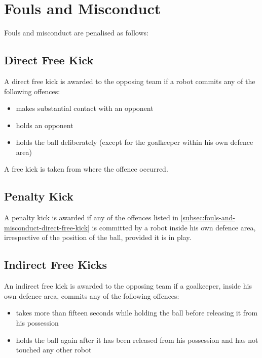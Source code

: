 \section{Fouls and Misconduct}\label{sec:fouls-and-misconduct}

Fouls and misconduct are penalised as follows:

\subsection{Direct Free Kick}\label{subsec:fouls-and-misconduct-direct-free-kick}
A direct free kick is awarded to the opposing team if a robot commits any of the following   offences:
\begin{itemize}
\item makes substantial contact with an opponent
\item holds an opponent
\item holds the ball deliberately (except for the goalkeeper within his own defence area)
\end{itemize}

A free kick is taken from where the offence occurred.

\subsection{Penalty Kick}
A penalty kick is awarded if any of the offences listed in \autoref{subsec:fouls-and-misconduct-direct-free-kick} is committed by a robot inside his own defence area, irrespective of the position of the ball, provided it is in play.



\subsection{Indirect Free Kicks}
An indirect free kick is awarded to the opposing team if a goalkeeper, inside his own defence area, commits any of the following offences:
\begin{itemize}
\item takes more than fifteen seconds while holding the ball before releasing it from his possession
\item holds the ball again after it has been released from his possession and has not touched any other robot
\end{itemize}


